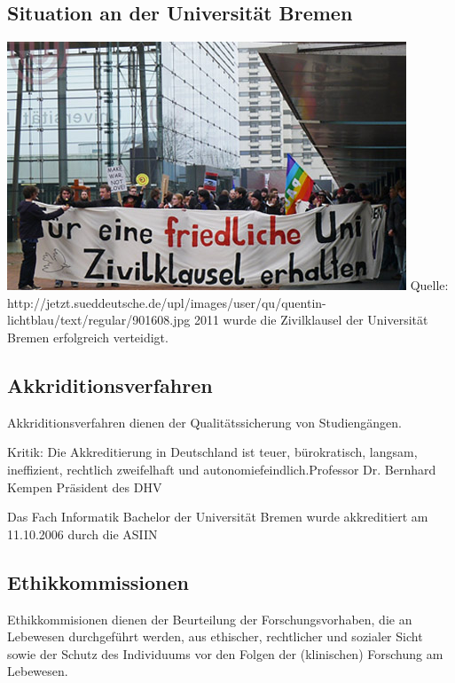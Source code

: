 \subsection*{Situation an der Universität Bremen}
\begin{frame}
\includegraphics[scale=0.5]{images/zivilklausel.jpg}
Quelle: http://jetzt.sueddeutsche.de/upl/images/user/qu/quentin-lichtblau/text/regular/901608.jpg
2011 wurde die Zivilklausel der Universität Bremen erfolgreich verteidigt.
\end{frame}

\subsection*{Akkriditionsverfahren}
\begin{frame}
Akkriditionsverfahren dienen der Qualitätssicherung von Studiengängen.
\end{frame}

\begin{frame}
Kritik:
\glqq Die Akkreditierung in Deutschland ist teuer, bürokratisch, langsam, ineffizient, rechtlich zweifelhaft und autonomiefeindlich.\grqq Professor Dr. Bernhard Kempen Präsident des DHV
\end{frame}

\begin{frame}
Das Fach Informatik Bachelor der Universität Bremen wurde  
akkreditiert am 11.10.2006 durch die ASIIN
\end{frame}

\subsection*{Ethikkommissionen}
\begin{frame}
Ethikkommisionen dienen der Beurteilung der Forschungsvorhaben, die an Lebewesen durchgeführt werden, aus ethischer, rechtlicher und sozialer Sicht sowie der Schutz des Individuums vor den Folgen der (klinischen) Forschung am Lebewesen.

\end{frame}




